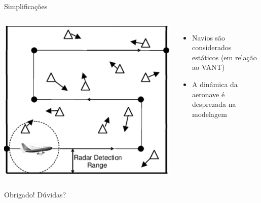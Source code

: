 \documentclass[10pt]{beamer}
\begin{document}
\begin{frame}{Simplificações}
    \begin{columns}
        \centering
        \includegraphics[width=\linewidth]{fig/vant.png}
        \centering
        \begin{itemize}
            \item Navios são considerados estáticos (em relação ao VANT)
            \item A dinâmica da aeronave é desprezada na modelagem
        \end{itemize}
    \end{columns}
\end{frame}

\begin{frame}{Obrigado!}
\centering
\Large Dúvidas?
\end{frame}


    
%     
%     
\end{document}
